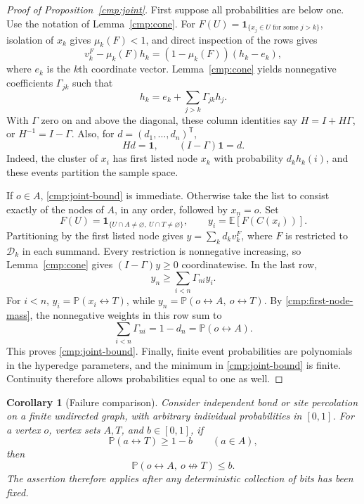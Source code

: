 \documentclass[11pt]{article}
\newtheorem{corollary}[theorem]{Corollary}
\theoremstyle{definition}
\theoremstyle{remark}
\numberwithin{equation}{section}
\begin{document}
\begin{proof}[Proof of Proposition~\ref{cmp:joint}]
First suppose all probabilities are below one. Use the notation of
Lemma~\ref{cmp:cone}. For
$F(U)=\mathbf 1_{\{x_j\in U\text{ for some }j>k\}}$, isolation of $x_k$
gives $\mu_k(F)<1$, and direct inspection of the rows gives
\[
 v_k^F-\mu_k(F)h_k=(1-\mu_k(F))(h_k-e_k),
\]
where $e_k$ is the $k$th coordinate vector. Lemma~\ref{cmp:cone} yields
nonnegative coefficients $\Gamma_{jk}$ such that
\[
 h_k=e_k+\sum_{j>k}\Gamma_{jk}h_j.
\]
With $\Gamma$ zero on and above the diagonal, these column identities say
$H=I+H\Gamma$, or $H^{-1}=I-\Gamma$. Also, for $d=(d_1,\ldots,d_n)^\mathsf T$,
\begin{equation}\label{cmp:first-node-mass}
 Hd=\mathbf 1,\qquad (I-\Gamma)\mathbf 1=d.
\end{equation}
Indeed, the cluster of $x_i$ has first listed node $x_k$ with probability
$d_kh_k(i)$, and these events partition the sample space.

If $o\in A$, \eqref{cmp:joint-bound} is immediate. Otherwise take the list
to consist exactly of the nodes of $A$, in any order, followed by $x_n=o$.
Set
\[
 F(U)=\mathbf 1_{\{U\cap A\ne\varnothing,\ U\cap T\ne\varnothing\}},
 \qquad y_i=\mathbb E[F(C(x_i))].
\]
Partitioning by the first listed node gives
$y=\sum_k d_kv_k^F$, where $F$ is restricted to $\mathcal D_k$ in each
summand. Every restriction is nonnegative increasing, so
Lemma~\ref{cmp:cone} gives $(I-\Gamma)y\ge0$ coordinatewise. In the last row,
\[
 y_n\ge\sum_{i<n}\Gamma_{ni}y_i.
\]
For $i<n$, $y_i=\mathbb P(x_i\leftrightarrow T)$, while
$y_n=\mathbb P(o\leftrightarrow A,\ o\leftrightarrow T)$. By
\eqref{cmp:first-node-mass}, the nonnegative weights in this row sum to
\[
 \sum_{i<n}\Gamma_{ni}=1-d_n=\mathbb P(o\leftrightarrow A).
\]
This proves \eqref{cmp:joint-bound}. Finally, finite event probabilities are
polynomials in the hyperedge parameters, and the minimum in
\eqref{cmp:joint-bound} is finite. Continuity therefore allows probabilities
equal to one as well.
\end{proof}

\begin{corollary}[Failure comparison]\label{cmp:failure}
Consider independent bond or site percolation on a finite undirected graph,
with arbitrary individual probabilities in $[0,1]$. For a vertex $o$, vertex
sets $A,T$, and $b\in[0,1]$, if
\[
 \mathbb P(a\leftrightarrow T)\ge1-b\qquad(a\in A),
\]
then
\begin{equation}\label{cmp:failure-bound}
 \mathbb P(o\leftrightarrow A,\ o\not\leftrightarrow T)\le b.
\end{equation}
The assertion therefore applies after any deterministic collection of bits
has been fixed.
\end{corollary}
\end{document}
